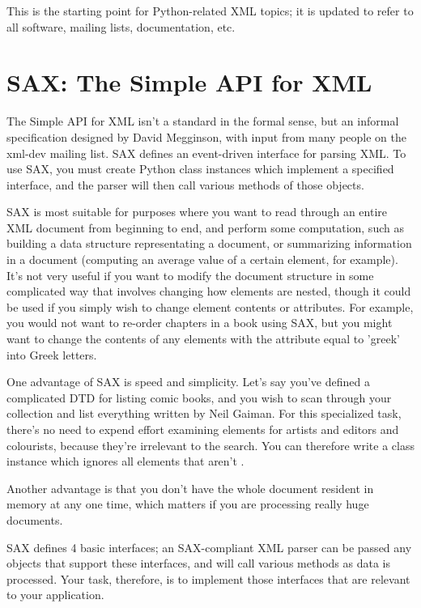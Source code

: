 \documentclass{howto}
\newcommand{\element}[1]{\code{#1}}
\newcommand{\attribute}[1]{\code{#1}}
\begin{document}
\begin{definitions}
%
This is the starting point for Python-related XML topics; it is
updated to refer to all software, mailing lists, documentation, etc. 

\end{definitions}

\section{SAX: The Simple API for XML}
\label{SAX}

The Simple API for XML isn't a standard in the formal sense, but an
informal specification designed by David Megginson, with input from
many people on the xml-dev mailing list.  SAX defines an event-driven
interface for parsing XML.  To use SAX, you must create Python class
instances which implement a specified interface, and the parser will
then call various methods of those objects.

SAX is most suitable for purposes where you want to read through an
entire XML document from beginning to end, and perform some
computation, such as building a data structure representating a
document, or summarizing information in a document (computing an
average value of a certain element, for example).  It's not very
useful if you want to modify the document structure in some
complicated way that involves changing how elements are nested, though
it could be used if you simply wish to change element contents or
attributes.  For example, you would not want to re-order chapters in a
book using SAX, but you might want to change the contents of any
\element{name} elements with the attribute \attribute{lang} equal to
'greek' into Greek letters.

One advantage of SAX is speed and simplicity.  Let's say
you've defined a complicated DTD for listing comic books, and you wish
to scan through your collection and list everything written by Neil
Gaiman.  For this specialized task, there's no need to expend effort
examining elements for artists and editors and colourists, because
they're irrelevant to the search.  You can therefore write a class
instance which ignores all elements that aren't \element{writer}.

Another advantage is that you don't have the whole document resident
in memory at any one time, which matters if you are processing really
huge documents.

SAX defines 4 basic interfaces; an SAX-compliant XML parser can be
passed any objects that support these interfaces, and will call
various methods as data is processed.  Your task, therefore, is to
implement those interfaces that are relevant to your application.
\end{document}
